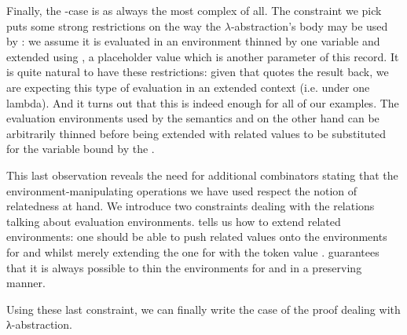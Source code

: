\begin{AgdaSuppressSpace}
\end{AgdaSuppressSpace}

Finally, the -case is as always the most complex of all. The
constraint we pick puts some strong restrictions on the way the $λ$-abstraction's
body may be used by : we assume it is evaluated in an environment
thinned by one variable and extended using , a placeholder value
which is another parameter of this record.
%
It is quite natural to have these restrictions: given that 
quotes the result back, we are expecting this type of evaluation in an
extended context (i.e. under one lambda). And it turns out that this is
indeed enough for all of our examples. The evaluation environments used
by the semantics  and  on the other hand can be arbitrarily
thinned before being extended with related values to be substituted for
the variable bound by the .

\begin{AgdaSuppressSpace}
\end{AgdaSuppressSpace}

This last observation reveals the need for additional combinators stating
that the environment-manipulating operations we have used respect the
notion of relatedness at hand. We introduce two constraints dealing with
the relations talking about evaluation environments.  tells
us how to extend related environments: one should be able to push related
values onto the environments for  and  whilst merely
extending the one for  with the token value .
 guarantees that it is always possible to thin
the environments for  and  in a  preserving manner.


Using these last constraint, we can finally write the case of the 
proof dealing with λ-abstraction.


